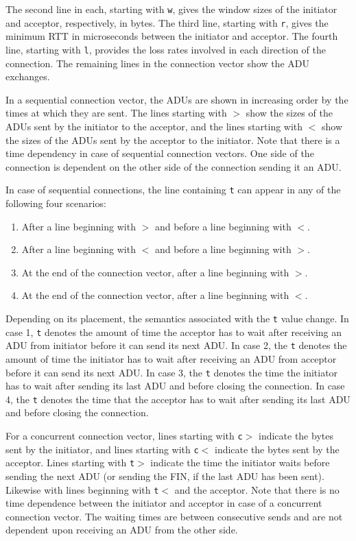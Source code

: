The second line in each, starting with \texttt{w}, gives the window
sizes of the initiator and acceptor, respectively, in bytes.  The
third line, starting with \texttt{r}, gives the minimum RTT in
microseconds between the initiator and acceptor.  The fourth line,
starting with \texttt{l}, provides the loss rates involved in each
direction of the connection. The remaining lines in the connection
vector show the ADU exchanges.

In a sequential connection vector, the ADUs are shown in increasing
order by the times at which they are sent.  The lines starting with
\texttt{$>$} show the sizes of the ADUs sent by the initiator
to the acceptor, and the lines starting with \texttt{$<$} show the
sizes of the ADUs sent by the acceptor to the initiator. Note
that there is a time dependency in case of sequential connection
vectors.  One side of the connection is dependent on the other side of
the connection sending it an ADU.

In case of sequential connections, the line containing
\texttt{t} can appear in any of the following four scenarios:
\begin{enumerate}
\item{After a line beginning with \texttt{$>$} and before a line
beginning with \texttt{$<$}}.
\item{After a line beginning with \texttt{$<$} and before a line
beginning with \texttt{$>$}}.
\item{At the end of the connection vector, after a line beginning with
\texttt{$>$}}.
\item{At the end of the connection vector, after a line beginning with
\texttt{$<$}}.
\end{enumerate}
Depending on its placement, the semantics associated with the
\texttt{t} value change. In case 1, \texttt{t} denotes the amount of
time the acceptor has to wait after receiving an ADU from initiator
before it can send its next ADU\@. In case 2, the \texttt{t} denotes
the amount of time the initiator has to wait after receiving an ADU
from acceptor before it can send its next ADU\@. In case 3, the
\texttt{t} denotes the time the initiator has to wait after sending
its last ADU and before closing the connection. In case 4, the
\texttt{t} denotes the time that the acceptor has to wait after
sending its last ADU and before closing the connection.

For a concurrent connection vector, lines starting with \texttt{c$>$}
indicate the bytes sent by the initiator, and lines starting with
\texttt{c$<$} indicate the bytes sent by the acceptor.  Lines starting
with \texttt{t$>$} indicate the time the initiator waits before
sending the next ADU (or sending the FIN, if the last ADU has been
sent).  Likewise with lines beginning with \texttt{t$<$} and the
acceptor.  Note that there is no time dependence between the initiator
and acceptor in case of a concurrent connection vector.  The waiting
times are between consecutive sends and are not dependent upon
receiving an ADU from the other side.

